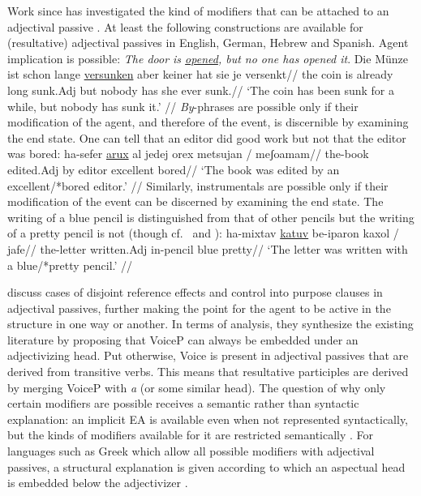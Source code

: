 Work since has investigated the kind of modifiers that can be attached to an adjectival passive \citep{meltzerasscher11,mcintyre13,alexiadouetal14,bruening14nllt,gehrkemarco14}. At least the following constructions are available for (resultative) adjectival passives in English, German, Hebrew and Spanish{. Agent implication is possible:}
\pex
	\a \ljudge{*} \emph{The door is \underline{opened}, but no one has opened it}.
	\a \ljudge{*} \begingl
		\gla Die M\"unze ist schon lange \underline{versunken} aber keiner hat sie je versenkt//
		\glb the coin is already long sunk.Adj but nobody has she ever sunk.//
		\glft `The coin has been sunk for a while, but nobody has sunk it.' //
	\endgl
\xe
{\emph{By}-phrases are possible only if their modification of the agent, and therefore of the event, is discernible by examining the end state. One can tell that an editor did good work but not that the editor was bored:}
\ex
	\begingl
		\gla ha-sefer \underline{arux} {al jedej} orex {\cmark}metsujan / {\xmark}meʃoamam//
		\glb the-book edited.Adj by editor \phantom{\cmark}excellent {} \phantom{\xmark}bored//
		\glft `The book was edited by an excellent/*bored editor.' //
	\endgl
\xe
{Similarly, instrumentals are possible only if their modification of the event can be discerned by examining the end state. The writing of a blue pencil is distinguished from that of other pencils but the writing of a pretty pencil is not} (though cf.~\citealt{mcintyre13} and \citealt{bruening14nllt}):
\ex
	\begingl
		\gla ha-mixtav \underline{katuv} be-iparon {\cmark}kaxol / {\xmark}jafe//
		\glb the-letter written.Adj in-pencil \phantom{\cmark}blue {} \phantom{\xmark}pretty//
		\glft `The letter was written with a blue/*pretty pencil.' //
	\endgl
\xe

\cite{alexiadouetal14} discuss cases of disjoint reference effects and control into purpose clauses in adjectival passives, further making the point for the agent to be active in the structure in one way or another. In terms of analysis, they synthesize the existing literature by proposing that VoiceP can always be embedded under an adjectivizing head. Put otherwise, Voice is present in adjectival passives that are derived from transitive verbs. This means that resultative participles are derived by merging VoiceP with \emph{a} (or some similar head). The question of why only certain modifiers are possible receives a semantic rather than syntactic explanation: an implicit EA is available even when not represented syntactically, but the kinds of modifiers available for it are restricted semantically \citep{bhattpancheva06}. For languages such as Greek which allow all possible modifiers with adjectival passives, a structural explanation is given according to which an aspectual head is embedded below the adjectivizer \citep{anagnostopoulou03,alexiadouetal14}.

